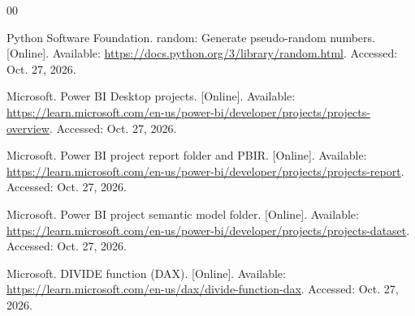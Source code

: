 \documentclass[conference,letterpaper]{IEEEtran}
\begin{document}
\balance
\begin{thebibliography}{00}

 Python Software Foundation. random: Generate pseudo-random numbers. [Online]. Available: \url{https://docs.python.org/3/library/random.html}. Accessed: Oct. 27, 2026.


 Microsoft. Power BI Desktop projects. [Online]. Available: \url{https://learn.microsoft.com/en-us/power-bi/developer/projects/projects-overview}. Accessed: Oct. 27, 2026.

 Microsoft. Power BI project report folder and PBIR. [Online]. Available: \url{https://learn.microsoft.com/en-us/power-bi/developer/projects/projects-report}. Accessed: Oct. 27, 2026.

 Microsoft. Power BI project semantic model folder. [Online]. Available: \url{https://learn.microsoft.com/en-us/power-bi/developer/projects/projects-dataset}. Accessed: Oct. 27, 2026.

 Microsoft. DIVIDE function (DAX). [Online]. Available: \url{https://learn.microsoft.com/en-us/dax/divide-function-dax}. Accessed: Oct. 27, 2026.

\end{thebibliography}
\end{document}
